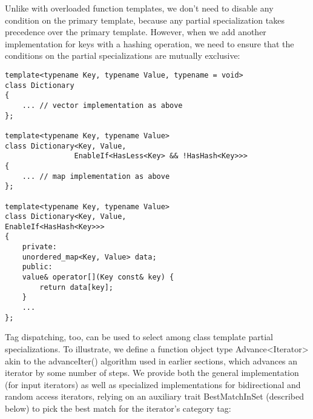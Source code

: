 Unlike with overloaded function templates, we don’t need to disable any condition on the primary template, because any partial specialization takes precedence over the primary template. However, when we add another implementation for keys with a hashing operation, we need to ensure that the conditions on the partial specializations are mutually exclusive:

\begin{lstlisting}[style=styleCXX]
template<typename Key, typename Value, typename = void>
class Dictionary
{
	... // vector implementation as above
};

template<typename Key, typename Value>
class Dictionary<Key, Value,
				EnableIf<HasLess<Key> && !HasHash<Key>>> 
{
	... // map implementation as above
};

template<typename Key, typename Value>
class Dictionary<Key, Value,
EnableIf<HasHash<Key>>>
{
	private:
	unordered_map<Key, Value> data;
	public:
	value& operator[](Key const& key) {
		return data[key];
	}
	...
};
\end{lstlisting}


Tag dispatching, too, can be used to select among class template partial specializations. To illustrate, we define a function object type Advance<Iterator> akin to the advanceIter() algorithm used in earlier sections, which advances an iterator by some number of steps. We provide both the general implementation (for input iterators) as well as specialized implementations for bidirectional and random access iterators, relying on an auxiliary trait BestMatchInSet (described below) to pick the best match for the iterator’s category tag:

